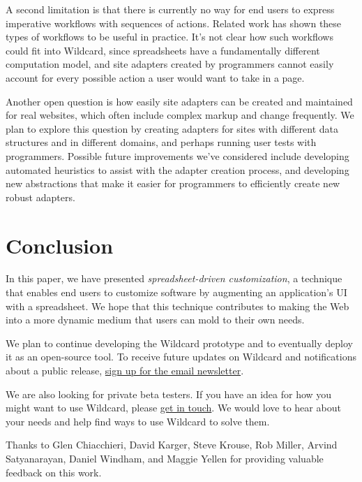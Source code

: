 \documentclass[english,submission]{programming}
\begin{document}
A second limitation is that there is currently no way for end users to
express imperative workflows with sequences of actions. Related work has
shown these types of workflows to be useful
\autocite{bolin2005,leshed2008} in practice. It's not clear how such
workflows could fit into Wildcard, since spreadsheets have a
fundamentally different computation model, and site adapters created by
programmers cannot easily account for every possible action a user would
want to take in a page.

Another open question is how easily site adapters can be created and
maintained for real websites, which often include complex markup and
change frequently. We plan to explore this question by creating adapters
for sites with different data structures and in different domains, and
perhaps running user tests with programmers. Possible future
improvements we've considered include developing automated heuristics to
assist with the adapter creation process, and developing new
abstractions that make it easier for programmers to efficiently create
new robust adapters.

\hypertarget{conclusion}{%
\section{Conclusion}\label{conclusion}}

In this paper, we have presented \emph{spreadsheet-driven
customization}, a technique that enables end users to customize software
by augmenting an application's UI with a spreadsheet. We hope that this
technique contributes to making the Web into a more dynamic medium that
users can mold to their own needs.

We plan to continue developing the Wildcard prototype and to eventually
deploy it as an open-source tool. To receive future updates on Wildcard
and notifications about a public release,
\href{https://geoffreylitt.substack.com/welcome}{sign up for the email
newsletter}.

We are also looking for private beta testers. If you have an idea for
how you might want to use Wildcard, please
\href{mailto:glitt@mit.edu}{get in touch}. We would love to hear about
your needs and help find ways to use Wildcard to solve them.

\acks
Thanks to Glen Chiacchieri, David Karger, Steve Krouse, Rob Miller, Arvind Satyanarayan, Daniel Windham, and Maggie Yellen for providing valuable feedback on this work.

\printbibliography
\end{document}

